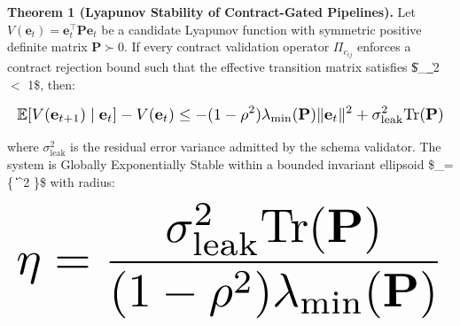 \documentclass[10pt,twocolumn,letterpaper]{article}
\begin{document}
\textbf{Theorem 1 (Lyapunov Stability of Contract-Gated Pipelines).} Let $V(\mathbf{e}_t) = \mathbf{e}_t^\top \mathbf{P} \mathbf{e}_t$ be a candidate Lyapunov function with symmetric positive definite matrix $\mathbf{P} \succ 0$. If every contract validation operator $\Pi_{c_{ij}}$ enforces a contract rejection bound such that the effective transition matrix satisfies \$\|\_{}\|\_2 \le \rho $<$ 1\$, then:





















\begin{equation}
\resizebox{\columnwidth}{!}{$\displaystyle
\begin{aligned}
\mathbb{E}[V(\mathbf{e}_{t+1}) \mid \mathbf{e}_t] - V(\mathbf{e}_t) \le -(1 - \rho^2) \lambda_{\min}(\mathbf{P}) \|\mathbf{e}_t\|^2 + \sigma_{\text{leak}}^2 \text{Tr}(\mathbf{P})
\end{aligned}
$}
\end{equation}





















where $\sigma_{\text{leak}}^2$ is the residual error variance admitted by the schema validator. The system is Globally Exponentially Stable within a bounded invariant ellipsoid \$\_\eta = \{ \mid \|\|^2 \le \eta\}\$ with radius:





















\begin{equation}
\resizebox{\columnwidth}{!}{$\displaystyle
\begin{aligned}
\eta = \frac{\sigma_{\text{leak}}^2 \text{Tr}(\mathbf{P})}{(1 - \rho^2) \lambda_{\min}(\mathbf{P})}
\end{aligned}
$}
\end{equation}
\end{document}
